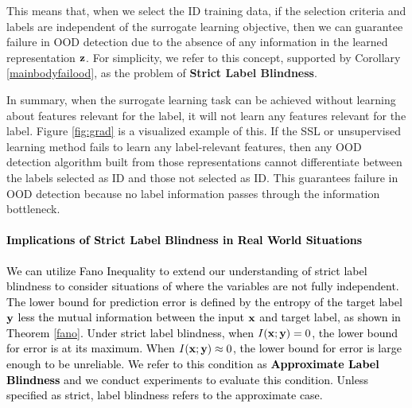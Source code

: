 \documentclass{article} %
\theoremstyle{plain}
\theoremstyle{definition}
\theoremstyle{remark}
\begin{document}
This means that, when we select the ID training data, if the selection criteria and labels are independent of the surrogate learning objective, then we can guarantee failure in OOD detection due to the absence of any information in the learned representation ${\mathbf{z}}$. For simplicity, we refer to this concept, supported by Corollary \ref{mainbodyfailood}, as the problem of \textbf{ Strict Label Blindness}. 

In summary, when the surrogate learning task can be achieved without learning about features relevant for the label, it will not learn any features relevant for the label. Figure \ref{fig:grad} is a visualized example of this. If the SSL or unsupervised learning method fails to learn any label-relevant features, then any OOD detection algorithm built from those representations cannot differentiate between the labels selected as ID and those not selected as ID. This guarantees failure in OOD detection because no label information passes through the information bottleneck. 


\paragraph{{\textcolor{black}{Implications of Strict Label Blindness in Real World Situations}}}

\textcolor{black}{We can utilize Fano Inequality to extend our understanding of strict label blindness to consider situations of where the variables are not fully independent. The lower bound for prediction error is defined by the entropy of the target label ${\mathbf{y}}$ less the mutual information between the input ${\mathbf{x}}$ and target label, as shown in Theorem \ref{fano}. Under strict label blindness, when $I({\mathbf{x}};{\mathbf{y}}) = 0$, the lower bound for error is at its maximum. When $I({\mathbf{x}};{\mathbf{y}}) \approx 0$, the lower bound for error is large enough to be unreliable. We refer to this condition as \textbf{Approximate Label Blindness} and we conduct experiments to evaluate this condition. Unless specified as strict, label blindness refers to the approximate case.  }

\label{approx}

\vspace{-4mm}
\end{document}
